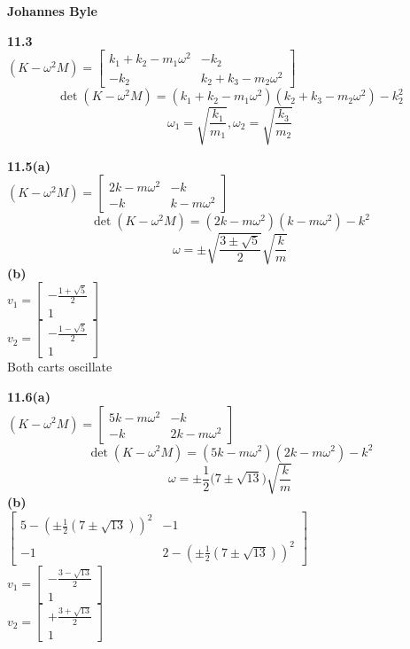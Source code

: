 \documentclass[english]{article}
\begin{document}
\begin{multicols*}{2}
\textbf{Johannes Byle}\\
\newcommand{\Lagr}{\mathcal{L}}

\noindent
\textbf{11.3}\\
$(K-\omega^2M)=
\begin{bmatrix}
  k_1+k_2-m_1\omega^2 & -k_2\\
  -k_2 & k_2+k_3-m_2\omega^2
 \end{bmatrix}
$\\
$$\det(K-\omega^2M)= (k_1+k_2-m_1\omega^2)(k_2+k_3-m_2\omega^2)-k_2^2$$
$$\omega_1=\sqrt{\frac{k_1}{m_1}},\omega_2=\sqrt{\frac{k_3}{m_2}}$$


\noindent
\textbf{11.5(a)}\\
$(K-\omega^2M)=
\begin{bmatrix}
  2k-m\omega^2 & -k\\
  -k & k-m\omega^2
 \end{bmatrix}
$\\
$$\det(K-\omega^2M)= (2k-m\omega^2)(k-m\omega^2)-k^2$$
$$\omega=\pm\sqrt{\frac{3\pm\sqrt{5}}{2}}\sqrt{\frac{k}{m}}$$
\textbf{(b)}\\
$v_1=
\begin{bmatrix}
  -\frac{1+\sqrt{5}}{2}\\ 
  1
\end{bmatrix}
$\\
$v_2=
\begin{bmatrix}
  -\frac{1-\sqrt{5}}{2}\\ 
  1
\end{bmatrix}
$\\
Both carts oscillate

\noindent
\textbf{11.6(a)}\\
$(K-\omega^2M)=
\begin{bmatrix}
  5k-m\omega^2 & -k\\
  -k & 2k-m\omega^2
 \end{bmatrix}
$\\
$$\det(K-\omega^2M)= (5k-m\omega^2)(2k-m\omega^2)-k^2$$
$$\omega=\pm\frac{1}{2}\big(7\pm\sqrt{13}\big)\sqrt{\frac{k}{m}}$$
\textbf{(b)}\\
$
\begin{bmatrix}
  5-(\pm\frac{1}{2}(7\pm\sqrt{13}))^2 & -1\\
  -1 & 2-(\pm\frac{1}{2}(7\pm\sqrt{13}))^2
 \end{bmatrix}
$\\
$v_1=
\begin{bmatrix}
-\frac{3-\sqrt{13}}{2}\\ 
1
\end{bmatrix}
$\\
$v_2=
\begin{bmatrix}
+\frac{3+\sqrt{13}}{2}\\ 
1
\end{bmatrix}
$\\
\end{multicols*}
\end{document}
